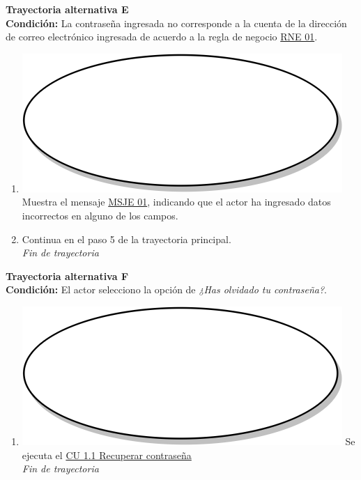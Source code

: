 \textbf{Trayectoria alternativa E} \label{cu1_ta_e}\\
\textbf{Condición:} La contraseña ingresada no corresponde a la cuenta de la dirección de correo electrónico ingresada de acuerdo a la regla de negocio \hyperref[rne_01]{RNE 01}.\\
 \begin{enumerate}[label=E\arabic*]
    \item {\includegraphics[scale=.05]{Capitulo3/img/proceso.png} Muestra el mensaje \hyperref[msje_01]{MSJE 01}, indicando que el actor ha ingresado datos incorrectos en alguno de los campos.}
    \item {Continua en el paso 5 de la trayectoria principal.} \\
    \textit{Fin de trayectoria} \\
\end{enumerate}

\textbf{Trayectoria alternativa F} \label{cu1_ta_f}\\
\textbf{Condición:} El actor selecciono la opción de \textit{¿Has olvidado tu contraseña?}.\\
 \begin{enumerate}[label=F\arabic*]
    \item {\includegraphics[scale=.05]{Capitulo3/img/proceso.png} Se ejecuta el \hyperref[cu1_1]{CU 1.1 Recuperar contraseña}} \\
    \textit{Fin de trayectoria} \\
\end{enumerate}

